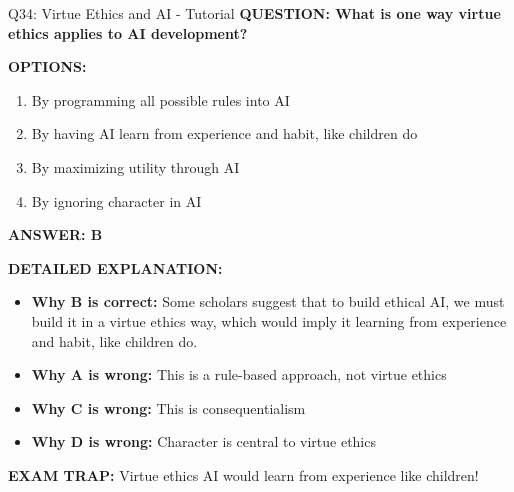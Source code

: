 \documentclass[8pt]{beamer}
\begin{document}
	\begin{frame}{Q34: Virtue Ethics and AI - Tutorial}
		\fontsize{6.5}{7.5}\selectfont
		\textbf{QUESTION: What is one way virtue ethics applies to AI development?}
		
		\vspace{0.1cm}
		\textbf{OPTIONS:}
		\begin{enumerate}
			\item By programming all possible rules into AI
			\item By having AI learn from experience and habit, like children do
			\item By maximizing utility through AI
			\item By ignoring character in AI
		\end{enumerate}
		
		\vspace{0.1cm}
		\textcolor{myblue}{\textbf{ANSWER: B}}
		
		\vspace{0.1cm}
		\textbf{DETAILED EXPLANATION:}
		\begin{itemize}
			\item \textbf{Why B is correct:} Some scholars suggest that to build ethical AI, we must build it in a virtue ethics way, which would imply it learning from experience and habit, like children do.
			\item \textbf{Why A is wrong:} This is a rule-based approach, not virtue ethics
			\item \textbf{Why C is wrong:} This is consequentialism
			\item \textbf{Why D is wrong:} Character is central to virtue ethics
		\end{itemize}
		
		\textcolor{myred}{\textbf{EXAM TRAP:}} Virtue ethics AI would \textcolor{myblue}{learn from experience like children}!
	\end{frame}
	
\end{document}
